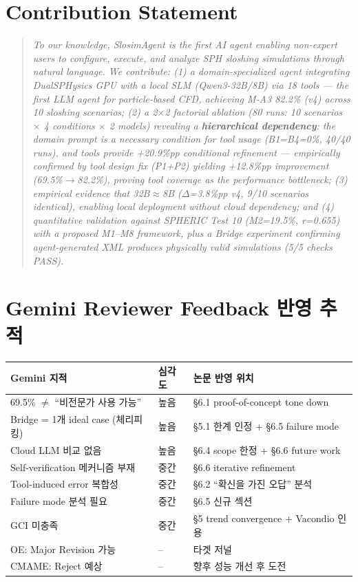 \documentclass[11pt,a4paper]{article}
\begin{document}
\section{Contribution Statement}

\begin{quote}
\textit{To our knowledge, SlosimAgent is the first AI agent enabling non-expert users to configure, execute, and analyze SPH sloshing simulations through natural language. We contribute: (1) a domain-specialized agent integrating DualSPHysics GPU with a local SLM (Qwen3-32B/8B) via 18 tools --- the first LLM agent for particle-based CFD, achieving M-A3 82.2\% (v4) across 10 sloshing scenarios; (2) a 2$\times$2 factorial ablation (80 runs: 10 scenarios $\times$ 4 conditions $\times$ 2 models) revealing a \textbf{hierarchical dependency}: the domain prompt is a necessary condition for tool usage (B1=B4=0\%, 40/40 runs), and tools provide +20.9\%pp conditional refinement --- empirically confirmed by tool design fix (P1+P2) yielding +12.8\%pp improvement (69.5\%$\rightarrow$82.2\%), proving tool coverage as the performance bottleneck; (3) empirical evidence that 32B$\approx$8B ($\Delta$=3.8\%pp v4, 9/10 scenarios identical), enabling local deployment without cloud dependency; and (4) quantitative validation against SPHERIC Test 10 (M2=19.5\%, r=0.655) with a proposed M1--M8 framework, plus a Bridge experiment confirming agent-generated XML produces physically valid simulations (5/5 checks PASS).}
\end{quote}

\section{{\color{red}Gemini Reviewer Feedback 반영 추적}}

\begin{tabular}{p{6cm}p{2cm}p{5cm}}
\toprule
\textbf{Gemini 지적} & \textbf{심각도} & \textbf{논문 반영 위치} \\
\midrule
69.5\% $\neq$ ``비전문가 사용 가능'' & 높음 & §6.1 proof-of-concept tone down \\
Bridge = 1개 ideal case (체리피킹) & 높음 & §5.1 한계 인정 + §6.5 failure mode \\
Cloud LLM 비교 없음 & 높음 & §6.4 scope 한정 + §6.6 future work \\
Self-verification 메커니즘 부재 & 중간 & §6.6 iterative refinement \\
Tool-induced error 복합성 & 중간 & §6.2 ``확신을 가진 오답'' 분석 \\
Failure mode 분석 필요 & 중간 & §6.5 신규 섹션 \\
GCI 미충족 & 중간 & §5 trend convergence + Vacondio 인용 \\
\midrule
OE: Major Revision 가능 & -- & 타겟 저널 \\
CMAME: Reject 예상 & -- & 향후 성능 개선 후 도전 \\
\bottomrule
\end{tabular}
\end{document}
